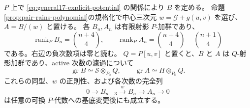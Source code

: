 \begin{proposition}[全係数にわたる射影性と正則性]
\label{prop:general17-universal-pbw}
$P$ 上で \eqref{eq:general17-explicit-potential} の関係により $B$ を定める。
命題\ref{prop:pair-rains-polynomial}の規格化で中心三次元 $w=\mathcal G+g(u,v)$ を選び、
$A=B/(w)$ と置ける。
各 $B_n,A_n$ は有限射影 $P$-加群であり、
\[
 \operatorname{rank}_P B_n=\binom{n+4}{4},\qquad
 \operatorname{rank}_P A_n=\binom{n+4}{4}-\binom{n+1}{4}
\]
である。右辺の負次数項は零と読む。
$Q=P[u,v]$ と置くと、$B$ と $A$ は $Q$-射影加群であり、active 次数の濾過について
\begin{equation}\label{eq:general17-relative-associated-graded}
 \operatorname{gr}B\simeq\mathscr S\otimes_{P_0}Q,
 \qquad \operatorname{gr}A\simeq H\otimes_{P_0}Q.
\end{equation}
これらの同型、$w$ の正則性、および各次数の完全列
\[
 0\longrightarrow B_{n-3}\xrightarrow{w}B_n\longrightarrow A_n\longrightarrow0
\]
は任意の可換 $P$-代数への基底変更後にも成立する。
\end{proposition}

